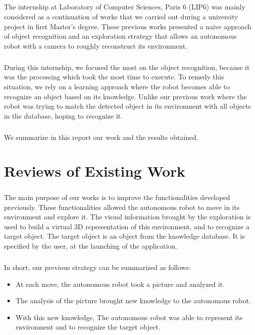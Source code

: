 \documentclass[12pt]{report}
\begin{document}
	\paragraph{}
	The internship at Laboratory of Computer Sciences, Paris 6 (LIP6) was mainly considered as a continuation of works that we carried out during a university project in first Master's degree. These previous works presented a naive approach of object recognition and an exploration strategy that allows an autonomous robot with a camera to roughly reconstruct its environment.
	
	\paragraph{}
	During this internship, we focused the most on the object recognition, because it was the processing which took the most time to execute. To remedy this situation, we rely on a learning approach where the robot becomes able to recognize an object based on its knowledge. Unlike our previous work where the robot was trying to match the detected object in its environment with all objects in the database, hoping to recognize it.
	
	\paragraph{}
	We summarize in this report our work and the results obtained.
	
    \chapter{Reviews of Existing Work}
	
	\paragraph{}
	The main purpose of our works is to improve the functionalities developed previously. These functionalities allowed the autonomous robot to move in its environment and explore it. The visual information brought by the exploration is used to build a virtual 3D representation of this environment, and to recognize a target object. The target object is an object from the knowledge database. It is specified by the user, at the launching of the application.
	
	\paragraph{}
	In short, our previous strategy can be summarized as follows:
	\begin{itemize}
		\item At each move, the autonomous robot took a picture and analyzed it.
		\item The analysis of the picture brought new knowledge to the autonomous robot.
		\item With this new knowledge, The autonomous robot was able to represent its environment and to recognize the target object.
	\end{itemize}
\end{document}
